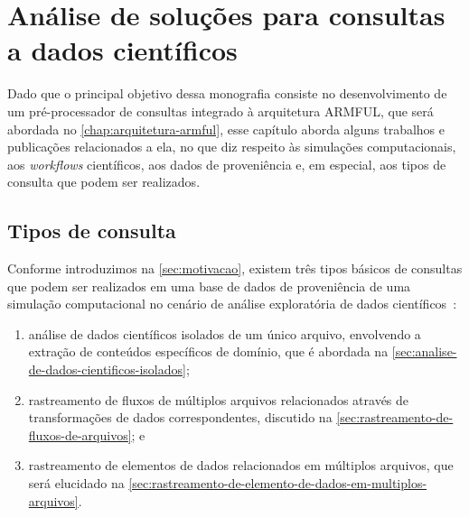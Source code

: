 


\chapter{Análise de soluções para consultas a dados científicos}%
\label{chap:analise-solucoes-consultas-dados-cientificos}

Dado que o principal objetivo dessa monografia consiste no desenvolvimento de um pré-processador de consultas integrado à arquitetura ARMFUL, que será abordada no \autoref{chap:arquitetura-armful}, esse capítulo aborda alguns trabalhos e publicações relacionados a ela, no que diz respeito às simulações computacionais, aos \textit{workflows} científicos, aos dados de proveniência e, em especial, aos tipos de consulta que podem ser realizados.

\section{Tipos de consulta}%
\label{sec:tipos-de-consulta}

Conforme introduzimos na \autoref{sec:motivacao}, existem três tipos básicos de consultas que podem ser realizados em uma base de dados de proveniência de uma simulação computacional no cenário de análise exploratória de dados científicos~\cite{silva2015analyzing,silva2015propostadoutorado}:

\begin{enumerate}
    \item análise de dados científicos isolados de um único arquivo, envolvendo a extração de conteúdos específicos de domínio, que é abordada na \autoref{sec:analise-de-dados-cientificos-isolados};
    \item rastreamento de fluxos de múltiplos arquivos relacionados através de transformações de dados correspondentes, discutido na \autoref{sec:rastreamento-de-fluxos-de-arquivos}; e
    \item rastreamento de elementos de dados relacionados em múltiplos arquivos, que será elucidado na \autoref{sec:rastreamento-de-elemento-de-dados-em-multiplos-arquivos}.
\end{enumerate}

